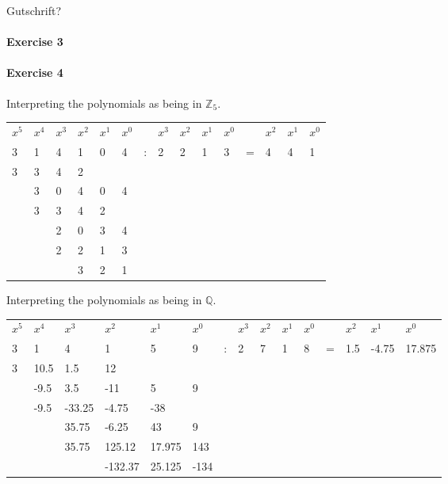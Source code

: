 \documentclass{article}
\begin{document}
Gutschrift?

\pagebreak
\paragraph{Exercise 3}

\pagebreak
\paragraph{Exercise 4}

Interpreting the polynomials as being in $\mathbb{Z}_5$.
\begin{center}
    \begin{tabular}{l l l l l l l l l l l l l l l}
        $x^5$&$x^4$&$x^3$&$x^2$&$x^1$&$x^0$&&$x^3$&$x^2$&$x^1$&$x^0$&&$x^2$&$x^1$&$x^0$ \\
        3&1&4&1&0&4 &:& 2&2&1&3 &=& 4&4&1 \\
        3&3&4&2&&&&&&&&&&& \\\cmidrule{1-4}
        &3&0&4&0&4&&&&&&&&& \\
        &3&3&4&2&&&&&&&&&& \\\cmidrule{2-5}
        &&2&0&3&4&&&&&&& \\
        &&2&2&1&3&&&&&&& \\\cmidrule{3-6}
        &&&3&2&1&&&&&&& \\
    \end{tabular}
\end{center}

Interpreting the polynomials as being in $\mathbb{Q}$.

\begin{center}
    \begin{tabular}{l l l l l l l l l l l l l l l}
        $x^5$&$x^4$&$x^3$&$x^2$&$x^1$&$x^0$&&$x^3$&$x^2$&$x^1$&$x^0$&&$x^2$&$x^1$&$x^0$ \\
        3&1&4&1&5&9 &:& 2&7&1&8 &=& 1.5&-4.75&17.875 \\
        3&10.5&1.5&12&&&&&&&&&&& \\\cmidrule{1-4}
        &-9.5&3.5&-11&5&9&&&&&&&&& \\
        &-9.5&-33.25&-4.75&-38&&&&&&&&&& \\\cmidrule{2-5}
        &&35.75&-6.25&43&9&&&&&&& \\
        &&35.75&125.12&17.975&143&&&&&&& \\\cmidrule{3-6}
        &&&-132.37&25.125&-134&&&&&&& \\
    \end{tabular}
\end{center}
\end{document}
